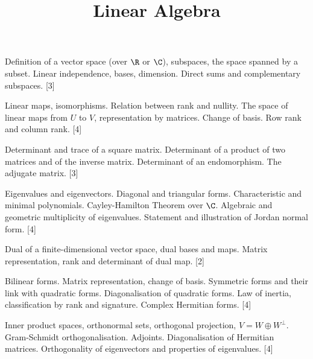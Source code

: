 \documentclass[twoside]{scrartcl}
\title{Linear Algebra}
\begin{document}
{
{\Large\bfseries{}}

Deﬁnition of a vector space (over $\R$ or $\C$), subspaces, the space spanned by a subset. Linear independence, bases, dimension. Direct sums and complementary subspaces. \hfill [3]

Linear maps, isomorphisms. Relation between rank and nullity. The space of linear maps from $U$ to $V$, representation by matrices. Change of basis. Row rank and column rank. \hfill [4]

Determinant and trace of a square matrix. Determinant of a product of two matrices and of the inverse matrix. Determinant of an endomorphism. The adjugate matrix. \hfill  [3]

Eigenvalues and eigenvectors. Diagonal and triangular forms. Characteristic and minimal polynomials. Cayley-Hamilton Theorem over $\C$. Algebraic and geometric multiplicity of eigenvalues. Statement and illustration of Jordan normal form. \hfill  [4]

Dual of a ﬁnite-dimensional vector space, dual bases and maps. Matrix representation, rank and determinant of dual map. \hfill  [2]

Bilinear forms. Matrix representation, change of basis. Symmetric forms and their link with quadratic forms. Diagonalisation of quadratic forms. Law of inertia, classification by rank and signature. Complex Hermitian forms. \hfill  [4]

Inner product spaces, orthonormal sets, orthogonal projection, $V=W\oplus W^\perp$. Gram-Schmidt orthogonalisation. Adjoints. Diagonalisation of Hermitian matrices. Orthogonality of eigenvectors and properties of eigenvalues. \hfill  [4]

}

\TableofContents

\end{document}
